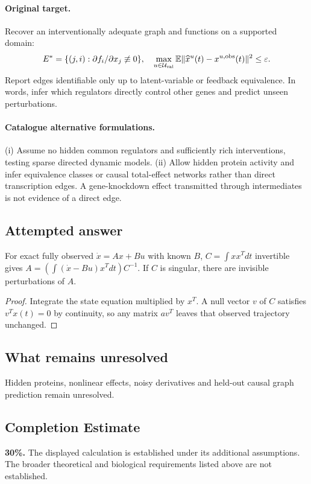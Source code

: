\documentclass[11pt]{article}
\begin{document}
\paragraph{Original target.}
Recover an interventionally adequate graph and functions on a supported domain:
\[
E^*=\{(j,i):\partial f_i/\partial x_j\not\equiv0\},
\quad\max_{u\in\mathcal U_{\rm val}}\mathbb{E}\|\widehat x^u(t)-x^{u,\rm obs}(t)\|^2\leq\varepsilon.
\]
Report edges identifiable only up to latent-variable or feedback equivalence. In words, infer which regulators directly control other genes and predict unseen perturbations.
\paragraph{Catalogue alternative formulations.}
(i) Assume no hidden common regulators and sufficiently rich interventions, testing sparse directed dynamic models. (ii) Allow hidden protein activity and infer equivalence classes or causal total-effect networks rather than direct transcription edges. A gene-knockdown effect transmitted through intermediates is not evidence of a direct edge.
\subsection{Attempted answer}
\begin{proposition}
For exact fully observed $\dot x=Ax+Bu$ with known $B$, $C=\int xx^Tdt$ invertible gives $A=(\int(\dot x-Bu)x^Tdt)C^{-1}$. If $C$ is singular, there are invisible perturbations of $A$.
\end{proposition}
\begin{proof}
Integrate the state equation multiplied by $x^T$. A null vector $v$ of $C$ satisfies $v^Tx(t)=0$ by continuity, so any matrix $av^T$ leaves that observed trajectory unchanged.
\end{proof}
\subsection{What remains unresolved}
Hidden proteins, nonlinear effects, noisy derivatives and held-out causal graph prediction remain unresolved.
\subsection{Completion Estimate}
\textbf{30\%.} The displayed calculation is established under its additional assumptions. The broader theoretical and biological requirements listed above are not established.
\end{document}
